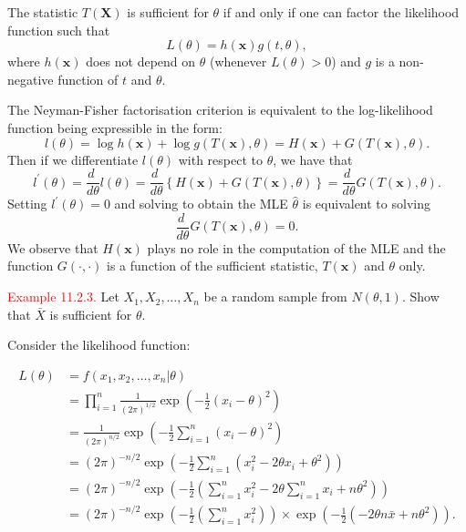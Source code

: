 \documentclass[
]{book}
\begin{document}
The statistic \(T(\mathbf{X})\) is sufficient for \(\theta\) if and only if one can factor the likelihood function such that
\[L(\theta) = h (\mathbf{x}) g(t,\theta),\]
where \(h(\mathbf{x})\) does not depend on \(\theta\) (whenever \(L(\theta)>0\)) and \(g\) is a non-negative function of \(t\) and \(\theta\).

The Neyman-Fisher factorisation criterion is equivalent to the log-likelihood function being expressible in the form:
\[l(\theta) = \log h(\mathbf{x}) + \log g (T(\mathbf{x}),\theta ) = H(\mathbf{x}) + G( T(\mathbf{x}),\theta ). \] Then if we differentiate \(l (\theta)\) with respect to \(\theta\), we have that
\[ l^\prime (\theta) = \frac{d \;}{d \theta} l (\theta) = \frac{d \;}{d \theta}\left\{H(\mathbf{x}) + G( T(\mathbf{x}),\theta ) \right\} = \frac{d \;}{d \theta}G( T(\mathbf{x}),\theta ). \]
Setting \(l^\prime (\theta)=0\) and solving to obtain the MLE \(\hat{\theta}\) is equivalent to solving
\[ \frac{d \;}{d \theta}G( T(\mathbf{x}),\theta ) =0.\] We observe that \(H(\mathbf{x})\) plays no role in the computation of the MLE and the function \(G (\cdot, \cdot)\) is a function of the sufficient statistic, \(T(\mathbf{x})\) and \(\theta\) only.

\leavevmode{}%
\textcolor{red}{Example 11.2.3.}
Let \(X_1,X_2,\dots,X_n\) be a random sample from \(N(\theta,1)\). Show that \(\bar{X}\)
is sufficient for \(\theta\).

Consider the likelihood function:

\begin{align*}
L(\theta) &= f(x_1,x_2,\dots,x_n|\theta) \\
&= \prod\limits_{i=1}^n \frac{1}{(2 \pi)^{1/2}} \exp \left(-\frac{1}{2} (x_i-\theta)^2 \right) \\
&= \frac{1}{(2 \pi)^{n/2}} \exp \left(-\frac{1}{2} \sum_{i=1}^n (x_i -\theta)^2 \right) \\
&= (2 \pi)^{-n/2} \exp \left(-\frac{1}{2} \sum\limits_{i=1}^n \left( x_i^2 -2 \theta x_i + \theta^2 \right) \right) \\
&= (2 \pi)^{-n/2} \exp \left(-\frac{1}{2} \left( \sum\limits_{i=1}^n x_i^2 - 2 \theta \sum\limits_{i=1}^n x_i + n \theta^2 \right) \right) \\
&= (2 \pi)^{-n/2} \exp \left(-\frac{1}{2} \left( \sum\limits_{i=1}^n x_i^2 \right) \right) \times \exp \left(-\frac{1}{2} \left( -2 \theta n \bar{x} + n \theta^2 \right) \right).
\end{align*}
\end{document}
